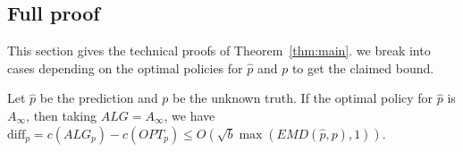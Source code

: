 \subsection{Full proof}
\label{sec:full proof of base algorithm}

This section gives the technical proofs of Theorem~\ref{thm:main}.
we break into cases depending on the optimal policies for $\hat{p}$ and $p$ to get the claimed bound.


\begin{lemma}
    \label{lm:phat Ainf and p AK with EMD O1}
    Let $\hat{p}$ be the prediction and $p$ be the unknown truth. If the optimal policy for $\hat{p}$ is $A_\infty$, then taking $ALG=A_\infty$, we have $\text{diff}_p = c(ALG_p) - c(OPT_p) \leq O(\sqrt{b} \max(EMD(\hat{p},p),1))$.
\end{lemma}

